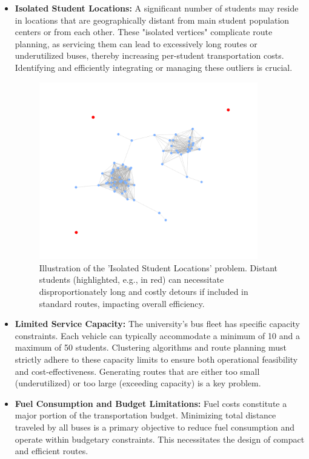 \begin{itemize}
    \item \textbf{Isolated Student Locations:} A significant number of students may reside in locations that are geographically distant from main student population centers or from each other. These "isolated vertices" complicate route planning, as servicing them can lead to excessively long routes or underutilized buses, thereby increasing per-student transportation costs. Identifying and efficiently integrating or managing these outliers is crucial.
    \begin{figure}[!htbp]
        \centering
        \includegraphics[width=0.9\textwidth]{img/robustness_problem.png}
        \caption{Illustration of the 'Isolated Student Locations' problem. Distant students (highlighted, e.g., in red) can necessitate disproportionately long and costly detours if included in standard routes, impacting overall efficiency.}
        \label{fig:problem_isolated_students}
    \end{figure}

    \item \textbf{Limited Service Capacity:} The university's bus fleet has specific capacity constraints. Each vehicle can typically accommodate a minimum of 10 and a maximum of 50 students. Clustering algorithms and route planning must strictly adhere to these capacity limits to ensure both operational feasibility and cost-effectiveness. Generating routes that are either too small (underutilized) or too large (exceeding capacity) is a key problem.

    \item \textbf{Fuel Consumption and Budget Limitations:} Fuel costs constitute a major portion of the transportation budget. Minimizing total distance traveled by all buses is a primary objective to reduce fuel consumption and operate within budgetary constraints. This necessitates the design of compact and efficient routes.


\end{itemize}

